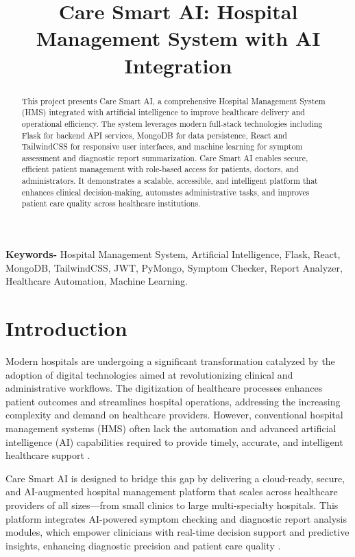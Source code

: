 \documentclass[conference]{IEEEtran}
\title{Care Smart AI: Hospital Management System with AI Integration}
\author{
\IEEEauthorblockN{Your Name, Collaborator Name}
\IEEEauthorblockA{Department of Computer Science Engineering \\
Your Institute Name, Location, Country}
}
\begin{document}
\maketitle

\noindent \textbf{Keywords-} Hospital Management System, Artificial Intelligence, Flask, React, MongoDB, TailwindCSS, JWT, PyMongo, Symptom Checker, Report Analyzer, Healthcare Automation, Machine Learning.

\begin{abstract}
This project presents Care Smart AI, a comprehensive Hospital Management System (HMS) integrated with artificial intelligence to improve healthcare delivery and operational efficiency. The system leverages modern full-stack technologies including Flask for backend API services, MongoDB for data persistence, React and TailwindCSS for responsive user interfaces, and machine learning for symptom assessment and diagnostic report summarization. Care Smart AI enables secure, efficient patient management with role-based access for patients, doctors, and administrators. It demonstrates a scalable, accessible, and intelligent platform that enhances clinical decision-making, automates administrative tasks, and improves patient care quality across healthcare institutions.
\end{abstract}

\section{Introduction}

Modern hospitals are undergoing a significant transformation catalyzed by the adoption of digital technologies aimed at revolutionizing clinical and administrative workflows. The digitization of healthcare processes enhances patient outcomes and streamlines hospital operations, addressing the increasing complexity and demand on healthcare providers. However, conventional hospital management systems (HMS) often lack the automation and advanced artificial intelligence (AI) capabilities required to provide timely, accurate, and intelligent healthcare support \cite{web:12,web:13}.

Care Smart AI is designed to bridge this gap by delivering a cloud-ready, secure, and AI-augmented hospital management platform that scales across healthcare providers of all sizes—from small clinics to large multi-specialty hospitals. This platform integrates AI-powered symptom checking and diagnostic report analysis modules, which empower clinicians with real-time decision support and predictive insights, enhancing diagnostic precision and patient care quality \cite{web:16,web:17}.
\end{document}
